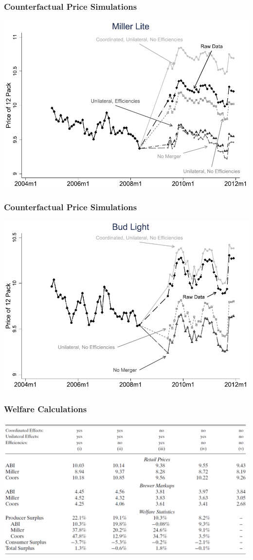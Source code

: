 \documentclass{beamer}
\begin{document}
\begin{frame}\frametitle{Counterfactual Price Simulations}
    \centering
    \includegraphics[width=0.95\linewidth]{fig_4}
\end{frame}

\begin{frame}\frametitle{Counterfactual Price Simulations}
    \centering
    \includegraphics[width=0.95\linewidth]{fig_5}
\end{frame}

\begin{frame}\frametitle{Welfare Calculations}
    \centering
    \includegraphics[width=0.95\linewidth]{table_10}
\end{frame}
\end{document}
